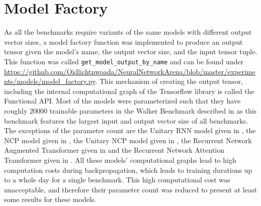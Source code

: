 \documentclass[draft,final]{vutinfth} %
\begin{document}
    \section{Model Factory}
    As all the benchmarks require variants of the same models with different output vector sizes, a model factory function was implemented to produce an output tensor given the model's name, the output vector size, and the input tensor tuple.
    This function was called \texttt{get\_model\_output\_by\_name} and can be found under \url{https://github.com/Oidlichtnwoada/NeuralNetworkArena/blob/master/experiments/models/model_factory.py}.
    This mechanism of creating the output tensor, including the internal computational graph of the Tensorflow library \cite{Tensorflow} is called the Functional API.
    Most of the models were parameterized such that they have roughly $20000$ trainable parameters in the Walker Benchmark described in  as this benchmark features the largest input and output vector size of all benchmarks.
    The exceptions of the parameter count are the Unitary RNN model given in , the NCP model given in , the Unitary NCP model given in , the Recurrent Network Augmented Transformer given in  and the Recurrent Network Attention Transformer given in .
    All these models' computational graphs lead to high computation costs during backpropagation, which leads to training durations up to a whole day for a single benchmark.
    This high computational cost was unacceptable, and therefore their parameter count was reduced to present at least some results for these models.
\end{document}
